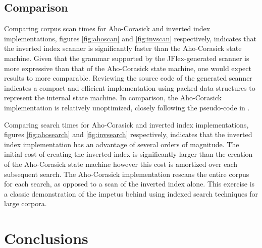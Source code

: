 \documentclass[10pt]{report}
\begin{document}
\subsection{Comparison}
Comparing corpus scan times for Aho-Corasick and inverted index
implementations, figures \ref{fig:ahoscan} and \ref{fig:invscan}
respectively, indicates that the inverted index scanner is
significantly faster than the Aho-Corasick state machine. Given that
the grammar supported by the JFlex-generated scanner is more expressive
than that of the Aho-Corasick state machine, one would expect results
to more comparable. Reviewing the source code of the generated scanner
indicates a compact and efficient implementation using packed data
structures to represent the internal state machine. In comparison, the
Aho-Corasick implementation is relatively unoptimized, closely
following the pseudo-code in \cite{RefWorks:103}.

Comparing search times for Aho-Corasick and inverted index
implementations, figures \ref{fig:ahosearch} and \ref{fig:invsearch}
respectively, indicates that the inverted index implementation has an
advantage of several orders of magnitude. The initial cost of creating
the inverted index is significantly larger than the creation of the
Aho-Corasick state machine however this cost is amortized over each
subsequent search. The Aho-Corasick implementation rescans the entire
corpus for each search, as opposed to a scan of the inverted index
alone. This exercise is a classic demonstration of the impetus behind
using indexed search techniques for large corpora.


\section{Conclusions}
\label{sec:conclusions}


\renewcommand\refname{References}




\end{document}
